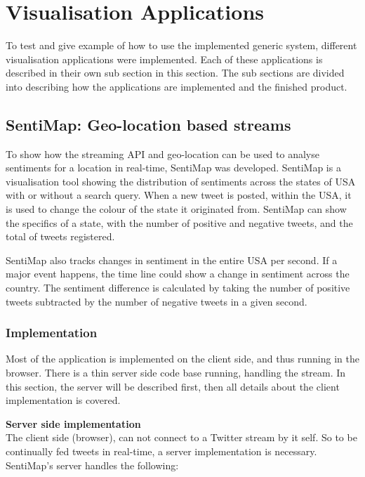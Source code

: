 \clearpage
\section{Visualisation Applications}
\label{sec:visualization_applications}
To test and give example of how to use the implemented generic system, different visualisation applications were implemented. Each of these applications is described in their own sub section in this section. The sub sections are divided into describing how the applications are implemented and the finished product.

\subsection{SentiMap: Geo-location based streams}

To show how the streaming API and geo-location can be used to analyse sentiments for a location in real-time, SentiMap was developed. SentiMap is a visualisation tool showing the distribution of sentiments across the states of USA with or without a search query. When a new tweet is posted, within the USA, it is used to change the colour of the state it originated from. SentiMap can show the specifics of a state, with the number of positive and negative tweets, and the total of tweets registered.

SentiMap also tracks changes in sentiment in the entire USA per second. If a major event happens, the time line could show a change in sentiment across the country. The sentiment difference is calculated by taking the number of positive tweets subtracted by the number of negative tweets in a given second. 

\subsubsection{Implementation}

Most of the application is implemented on the client side, and thus running in the browser. There is a thin server side code base running, handling the stream. In this section, the server will be described first, then all details about the client implementation is covered. 


\textbf{Server side implementation} \\

The client side (browser), can not connect to a Twitter stream by it self. So to be continually fed tweets in real-time, a server implementation is necessary. SentiMap's server handles the following:

